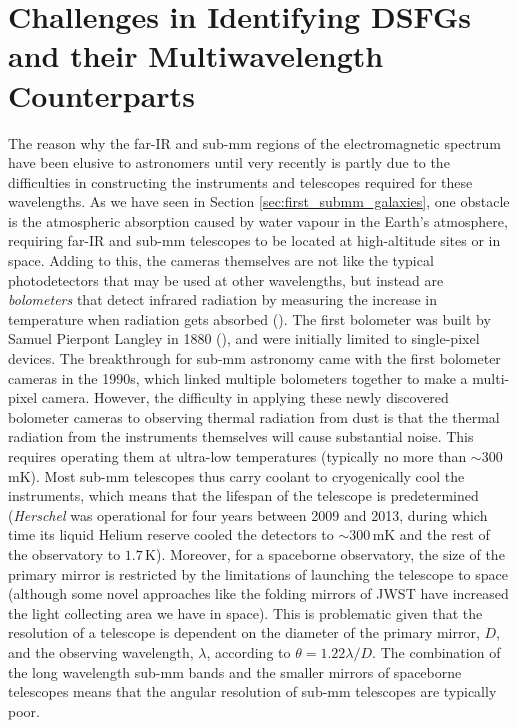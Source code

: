 \section{Challenges in Identifying DSFGs and their Multiwavelength Counterparts}
\label{sec:challenges}

The reason why the far-IR and sub-mm regions of the electromagnetic spectrum have been elusive to astronomers until very recently is partly due to the difficulties in constructing the instruments and telescopes required for these wavelengths. As we have seen in Section \ref{sec:first_submm_galaxies}, one obstacle is the atmospheric absorption caused by water vapour in the Earth's atmosphere, requiring far-IR and sub-mm telescopes to be located at high-altitude sites or in space. Adding to this, the cameras themselves are not like the typical photodetectors that may be used at other wavelengths, but instead are \textit{bolometers} that detect infrared radiation by measuring the increase in temperature when radiation gets absorbed (\citealt{Woodcraft_2009}). The first bolometer was built by Samuel Pierpont Langley in 1880 (\citealt{Langley_1880}), and were initially limited to single-pixel devices. The breakthrough for sub-mm astronomy came with the first bolometer cameras in the 1990s, which linked multiple bolometers together to make a multi-pixel camera. However, the difficulty in applying these newly discovered bolometer cameras to observing thermal radiation from dust is that the thermal radiation from the instruments themselves will cause substantial noise. This requires operating them at ultra-low temperatures (typically no more than $\sim 300\,$mK). Most sub-mm telescopes thus carry coolant to cryogenically cool the instruments, which means that the lifespan of the telescope is predetermined (\textit{Herschel} was operational for four years between 2009 and 2013, during which time its liquid Helium reserve cooled the detectors to $\sim 300\,$mK and the rest of the observatory to $1.7\,$K). Moreover, for a spaceborne observatory, the size of the primary mirror is restricted by the limitations of launching the telescope to space (although some novel approaches like the folding mirrors of JWST have increased the light collecting area we have in space). This is problematic given that the resolution of a telescope is dependent on the diameter of the primary mirror, $D$, and the observing wavelength, $\lambda$, according to $\theta = 1.22\lambda/D$. The combination of the long wavelength sub-mm bands and the smaller mirrors of spaceborne telescopes means that the angular resolution of sub-mm telescopes are typically poor.

